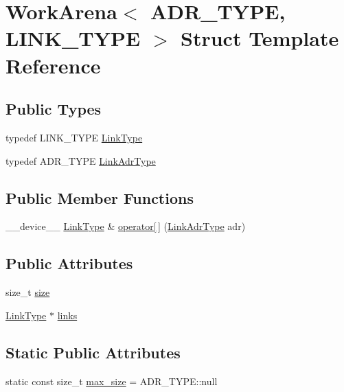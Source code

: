 \hypertarget{structWorkArena}{\section{Work\-Arena$<$ A\-D\-R\-\_\-\-T\-Y\-P\-E, L\-I\-N\-K\-\_\-\-T\-Y\-P\-E $>$ Struct Template Reference}
\label{structWorkArena}
}
\subsection*{Public Types}
\begin{DoxyCompactItemize}
\item 
typedef L\-I\-N\-K\-\_\-\-T\-Y\-P\-E \hyperlink{structWorkArena_a2bf1c203f8a046339cd73be8b3136c28}{Link\-Type}
\item 
typedef A\-D\-R\-\_\-\-T\-Y\-P\-E \hyperlink{structWorkArena_a1ad8a6c99cd108b5bb80df40d468637b}{Link\-Adr\-Type}
\end{DoxyCompactItemize}
\subsection*{Public Member Functions}
\begin{DoxyCompactItemize}
\item 
\-\_\-\-\_\-device\-\_\-\-\_\- \hyperlink{structWorkArena_a2bf1c203f8a046339cd73be8b3136c28}{Link\-Type} \& \hyperlink{structWorkArena_ae06bc5769201f321876c12c9db43cf00}{operator\mbox{[}$\,$\mbox{]}} (\hyperlink{structWorkArena_a1ad8a6c99cd108b5bb80df40d468637b}{Link\-Adr\-Type} adr)
\end{DoxyCompactItemize}
\subsection*{Public Attributes}
\begin{DoxyCompactItemize}
\item 
size\-\_\-t \hyperlink{structWorkArena_a81695ccf6b50e8b81091fea89855a92a}{size}
\item 
\hyperlink{structWorkArena_a2bf1c203f8a046339cd73be8b3136c28}{Link\-Type} $\ast$ \hyperlink{structWorkArena_ab1707583be64a275e61cdb20a4806545}{links}
\end{DoxyCompactItemize}
\subsection*{Static Public Attributes}
\begin{DoxyCompactItemize}
\item 
static const size\-\_\-t \hyperlink{structWorkArena_ab715ef7888d28790b140f743aaafd460}{max\-\_\-size} = A\-D\-R\-\_\-\-T\-Y\-P\-E\-::null
\end{DoxyCompactItemize}


